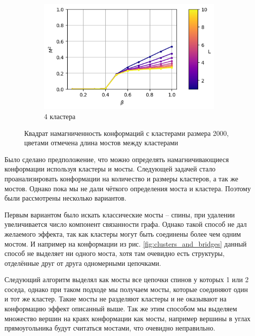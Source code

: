\begin{figure}[ht]
\begin{subfigure}[t]{0.45\textwidth}
    \end{subfigure}
    \begin{subfigure}[t]{0.45\textwidth}
        \includegraphics*[width=\textwidth]{../images/magnetization_clusterized_W20_H50_N4.png}
        \caption*{4 кластера}
    \end{subfigure}
	\caption{Квадрат намагниченность конформаций с кластерами размера 2000, цветами отмечена длина мостов между кластерами}
	\label{fig:cluster_magnetization}
\end{figure}

Было сделано предположение, что можно определять намагничивающиеся конформации используя кластеры и мосты. Следующей задачей стало проанализировать конформации на количество и размеры кластеров, а так же мостов. Однако пока мы не дали чёткого определения моста и кластера. Поэтому были рассмотрены несколько вариантов.

Первым вариантом было искать классические мосты -- спины, при удалении увеличивается число компонент связанности графа. Однако такой способ не дал желаемого эффекта, так как кластеры могут быть соединены более чем одним мостом. И например на конформации из рис. \ref{fig:clusters_and_bridges} данный способ не выделяет ни одного моста, хотя там очевидно есть структуры, отделённые друг от друга одномерными цепочками. 

Следующий алгоритм выделял как мосты все цепочки спинов у которых 1 или 2 соседа, однако при таком подходе мы получаем мосты, которые соединяют один и тот же кластер. Такие мосты не разделяют кластеры и не оказывают на конформацию эффект описанный выше. Так же этим способом мы выделяем множество вершин на краях конформации как мосты, например вершины в углах прямоугольника будут считаться мостами, что очевидно неправильно.

